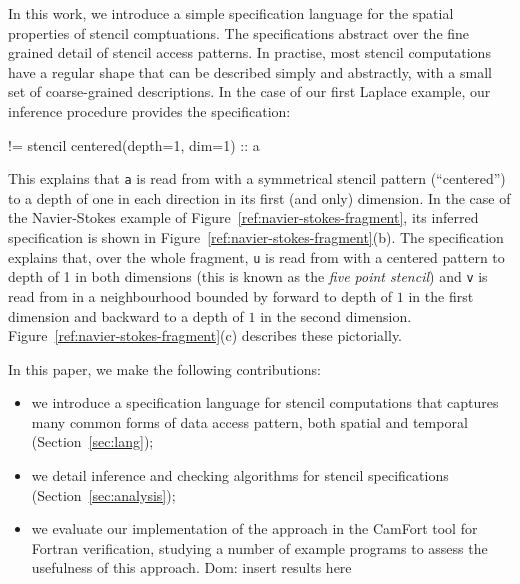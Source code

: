 \documentclass[9pt]{sigplanconf}
\newcommand{\dnote}[1]{\textcolor{darkpurple}{Dom: #1}}
\theoremstyle{definition}
\begin{document}
In this work, we introduce a simple specification language for the
spatial properties of stencil comptuations. The
specifications abstract over the fine grained detail of stencil access
patterns.  In practise, most stencil computations have a regular shape
that can be described simply and abstractly, with a small set of
coarse-grained descriptions. In the case of our first Laplace example,
our inference procedure provides the specification:
%
\begin{SpecVerbatim}
!=  stencil centered(depth=1, dim=1) :: a
\end{SpecVerbatim}
%
This explains that \texttt{a} is read from with a
symmetrical stencil pattern (``centered'') to a depth of one in each
direction in its first (and only) dimension.  
In the case of the Navier-Stokes example of
Figure~\ref{ref:navier-stokes-fragment}, its inferred specification is shown
in Figure~\ref{ref:navier-stokes-fragment}(b). The 
specification explains that, over the whole fragment, \texttt{u} is
read from with a centered pattern to depth of 1 in both dimensions
(this is known as the \emph{five point stencil}) and \texttt{v}
is read from in a neighbourhood bounded by forward to depth of $1$ in
the first dimension and backward to a depth of $1$ in the second
dimension. Figure~\ref{ref:navier-stokes-fragment}(c) describes these
pictorially. 

In this paper, we make the following contributions:
%
\begin{itemize}
\item we introduce a specification language for
stencil computations that captures many common forms
of data access pattern, both spatial and temporal (Section~\ref{sec:lang});
\item we detail inference and checking
algorithms for stencil specifications (Section~\ref{sec:analysis});
\item we evaluate our implementation of the approach
in the CamFort tool for Fortran verification, studying
a number of example programs to assess the usefulness
of this approach.
\dnote{insert results here}
\end{itemize}
%
\end{document}
